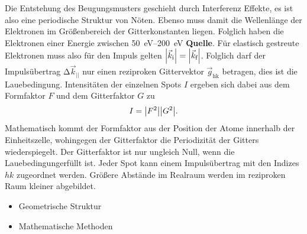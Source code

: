         Die Entstehung des Beugungsmusters geschieht durch Interferenz Effekte, es ist also eine periodische Struktur von Nöten.
        Ebenso muss damit die Wellenlänge der Elektronen im Größenbereich der Gitterkonstanten liegen.
        Folglich haben die Elektronen einer Energie zwischen \SIrange{50}{200}{\electronvolt} \textbf{Quelle}.
        Für elastisch gestreute Elektronen muss also für den Impuls gelten $\abs*{\vec{k}_\text{i}} = \abs*{\vec{k}_\text{f}}$.
        Folglich darf der Impulsübertrag $\increment \vec{k}_{||}$ nur einen reziproken Gittervektor $\vec{g}_\text{hk}$ betragen, dies ist die Lauebedingung.     
        Intensitäten der einzelnen Spots $I$ ergeben sich dabei aus dem Formfaktor $F$ und dem Gitterfaktor $G$ zu
        \begin{equation}
            I = \abs*{F^2}\abs*{G^2}.
            \label{eqn:LEED}
        \end{equation}
        Mathematisch kommt der Formfaktor aus der Position der Atome innerhalb der Einheitszelle, wohingegen der Gitterfaktor die Periodizität der Gitters wiederspiegelt.
        Der Gitterfaktor ist nur ungleich Null, wenn die Lauebedingungerfüllt ist.
        Jeder Spot kann einem Impulsübertrag mit den Indizes $hk$ zugeordnet werden. 
        Größere Abstände im Realraum werden im reziproken Raum kleiner abgebildet.

            \begin{itemize}
                \item Geometrische Struktur
                \item Mathematische Methoden
            \end{itemize}

    
